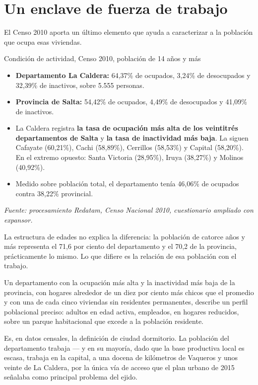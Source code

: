 \section{Un enclave de fuerza de trabajo}

El Censo 2010 aporta un último elemento que ayuda a caracterizar a la población que ocupa esas viviendas.

\begin{ficha}{Condición de actividad, Censo 2010, población de 14 años y más}
\begin{itemize}[leftmargin=*,nosep]
\item \textbf{Departamento La Caldera:} 64,37\% de ocupados, 3,24\% de desocupados y 32,39\% de inactivos, sobre 5.555 personas.
\item \textbf{Provincia de Salta:} 54,42\% de ocupados, 4,49\% de desocupados y 41,09\% de inactivos.
\item La Caldera registra \textbf{la tasa de ocupación más alta de los veintitrés departamentos de Salta} y \textbf{la tasa de inactividad más baja}. La siguen Cafayate (60,21\%), Cachi (58,89\%), Cerrillos (58,53\%) y Capital (58,20\%). En el extremo opuesto: Santa Victoria (28,95\%), Iruya (38,27\%) y Molinos (40,92\%).
\item Medido sobre población total, el departamento tenía 46,06\% de ocupados contra 38,22\% provincial.
\end{itemize}
\textit{Fuente: procesamiento Redatam, Censo Nacional 2010, cuestionario ampliado con expansor.}
\end{ficha}

La estructura de edades no explica la diferencia: la población de catorce años y más representa el 71,6 por ciento del departamento y el 70,2 de la provincia, prácticamente lo mismo. Lo que difiere es la relación de esa población con el trabajo.

Un departamento con la ocupación más alta y la inactividad más baja de la provincia, con hogares alrededor de un diez por ciento más chicos que el promedio y con una de cada cinco viviendas sin residentes permanentes, describe un perfil poblacional preciso: adultos en edad activa, empleados, en hogares reducidos, sobre un parque habitacional que excede a la población residente.

Es, en datos censales, la definición de ciudad dormitorio. La población del departamento trabaja --- y en su mayoría, dado que la base productiva local es escasa, trabaja en la capital, a una docena de kilómetros de Vaqueros y unos veinte de La Caldera, por la única vía de acceso que el plan urbano de 2015 señalaba como principal problema del ejido.

